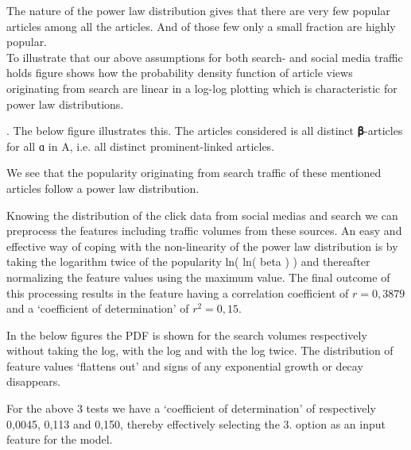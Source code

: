 The nature of the power law distribution gives that there are very few popular articles among all the articles. And of those few only a small fraction are highly popular.\\

To illustrate that our above assumptions for both search- and social media traffic holds figure  shows how the probability density function of article views originating from search are linear in a log-log plotting which is characteristic for power law distributions.\\


\medskip

. The below figure illustrates this. The articles considered is all distinct 𝛃-articles for all ɑ in A, i.e. all distinct prominent-linked articles.

We see that the popularity originating from search traffic of these mentioned articles follow a power law distribution.

Knowing the distribution of the click data from social medias and search we can preprocess the features including traffic volumes from these sources. An easy and effective way of coping with the non-linearity of the power law distribution is by taking the logarithm twice of the popularity ln( ln( beta ) ) and thereafter normalizing the feature values using the maximum value.
The final outcome of this processing results in the feature having a correlation coefficient of $r = 0,3879$ and a `coefficient of determination' of $r^2 = 0,15$.  

In the below figures the PDF is shown for the search volumes respectively without taking the log, with the log and with the log twice. The distribution of feature values `flattens out' and signs of any exponential growth or decay disappears.

For the above 3 tests we have a `coefficient of determination' of respectively 0,0045, 0,113 and 0,150, thereby effectively selecting the 3. option as an input feature for the model.

